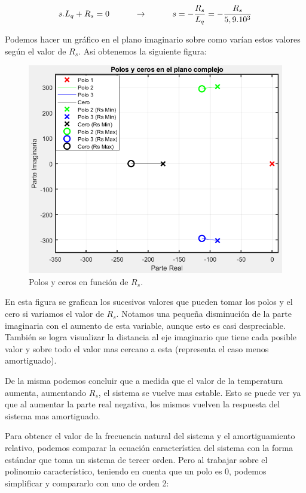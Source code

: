 \documentclass{article}
\begin{document}
\begin{equation*}
    s.L_q+ R_s = 0 \quad\quad\quad\to\quad\quad\quad s = - \frac{R_s}{L_q} = - \frac{R_s}{5,9.10^3}\\ 
\end{equation*}

Podemos hacer un gráfico en el plano imaginario sobre como varían estos valores según el valor de 
$R_s$. Asi obtenemos la siguiente figura:

\begin{figure}[H]
    \centering
    \includegraphics{polosyceros.png}
    \caption{Polos y ceros en función de $R_s$.}
\end{figure}

En esta figura se grafican los sucesivos valores que pueden tomar los polos y el cero si variamos el 
valor de $R_s$. Notamos una pequeña disminución de la parte imaginaria con el aumento de esta variable, 
aunque esto es casi despreciable. También se logra visualizar la distancia al eje imaginario que 
tiene cada posible valor y sobre todo el valor mas cercano a esta (representa el caso menos 
amortiguado).

De la misma podemos concluir que a medida que el valor de la temperatura aumenta, aumentando $R_s$, el 
sistema se vuelve mas estable. Esto se puede ver ya que al aumentar la parte real negativa, los 
mismos vuelven la respuesta del sistema mas amortiguado.

Para obtener el valor de la frecuencia natural del sistema y el amortiguamiento relativo, podemos 
comparar la ecuación característica del sistema con la forma estándar que toma un sistema de tercer 
orden. Pero al trabajar sobre el polinomio característico, teniendo en cuenta que un polo es 0, 
podemos simplificar y compararlo con uno de orden 2:
\end{document}
